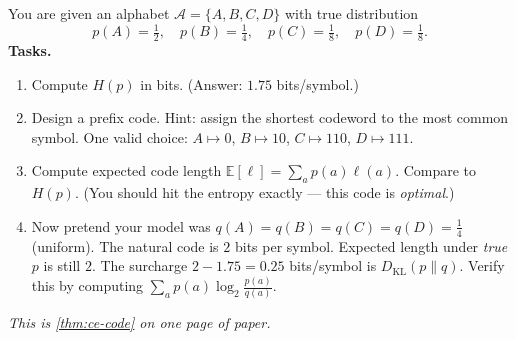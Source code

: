 \begin{activity}[title={Activity 3.A --- Compress your own message (paper, 10 min)}]
\label{act:compress-paper}
You are given an alphabet $\mathcal{A} = \{A, B, C, D\}$ with true
distribution
\[
 p(A) = \tfrac{1}{2}, \quad p(B) = \tfrac{1}{4}, \quad
 p(C) = \tfrac{1}{8}, \quad p(D) = \tfrac{1}{8}.
\]
\textbf{Tasks.}
\begin{enumerate}[leftmargin=*, itemsep=2pt]
  \item Compute $H(p)$ in bits.  (Answer: $1.75$ bits/symbol.)
  \item Design a prefix code.  Hint: assign the shortest codeword to
        the most common symbol.  One valid choice: $A\!\mapsto\!0$,
        $B\!\mapsto\!10$, $C\!\mapsto\!110$, $D\!\mapsto\!111$.
  \item Compute expected code length
        $\mathbb{E}[\ell] = \sum_a p(a)\ell(a)$.  Compare to $H(p)$.
        (You should hit the entropy exactly --- this code is
        \emph{optimal}.)
  \item Now pretend your model was $q(A)=q(B)=q(C)=q(D)=\tfrac{1}{4}$
        (uniform).  The natural code is $2$ bits per symbol.
        Expected length under \emph{true} $p$ is still $2$.  The
        surcharge $2 - 1.75 = 0.25$ bits/symbol is
        $D_{\mathrm{KL}}(p\|q)$.  Verify this by computing
        $\sum_a p(a)\log_2\frac{p(a)}{q(a)}$.
\end{enumerate}
\emph{This is \cref{thm:ce-code} on one page of paper.}
\end{activity}

